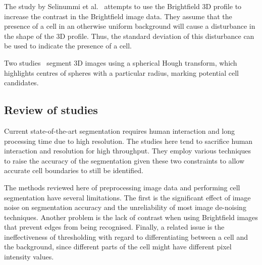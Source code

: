 The study by Selinummi et al.~\cite{selinummi} attempts to use the Brightfield 3D profile to increase the contrast in the Brightfield image data. They assume that the presence of a cell in an otherwise uniform background will cause a disturbance in the shape of the 3D profile. Thus, the standard deviation of this disturbance can be used to indicate the presence of a cell.

Two studies~\cite{liu/zanella} segment 3D images using a spherical Hough transform, which highlights centres of spheres with a particular radius, marking potential cell candidates.

\subsection{Review of studies}

Current state-of-the-art segmentation requires human interaction and long processing time due to high resolution. The studies here tend to sacrifice human interaction and resolution for high throughput. They employ various techniques to raise the accuracy of the segmentation given these two constraints to allow accurate cell boundaries to still be identified.

The methods reviewed here of preprocessing image data and performing cell segmentation have several limitations. The first is the significant effect of image noise on segmentation accuracy and the unreliability of most image de-noising techniques. Another problem is the lack of contrast when using Brightfield images that prevent edges from being recognised. Finally, a related issue is the ineffectiveness of thresholding with regard to differentiating between a cell and the background, since different parts of the cell might have different pixel intensity values.
